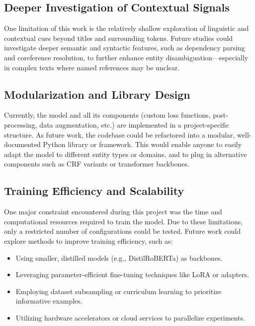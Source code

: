 \documentclass[a4paper]{usiinfbachelorproject}
\begin{document}
\subsection{Deeper Investigation of Contextual Signals}

One limitation of this work is the relatively shallow exploration of linguistic and contextual cues beyond titles and surrounding tokens. Future studies could investigate deeper semantic and syntactic features, such as dependency parsing and coreference resolution, to further enhance entity disambiguation—especially in complex texts where named references may be unclear.

\subsection{Modularization and Library Design}

Currently, the model and all its components (custom loss functions, post-processing, data augmentation, etc.) are implemented in a project-specific structure. As future work, the codebase could be refactored into a modular, well-documented Python library or framework. This would enable anyone to easily adapt the model to different entity types or domains, and to plug in alternative components such as CRF variants or transformer backbones.

\subsection{Training Efficiency and Scalability}

One major constraint encountered during this project was the time and computational resources required to train the model. Due to these limitations, only a restricted number of configurations could be tested. Future work could explore methods to improve training efficiency, such as:

\begin{itemize}
    \item Using smaller, distilled models (e.g., DistilRoBERTa) as backbones.
    \item Leveraging parameter-efficient fine-tuning techniques like LoRA or adapters.
    \item Employing dataset subsampling or curriculum learning to prioritize informative examples.
    \item Utilizing hardware accelerators or cloud services to parallelize experiments.
\end{itemize}
\end{document}
